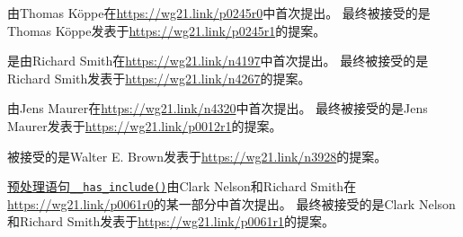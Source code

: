 由Thomas Köppe在\url{https://wg21.link/p0245r0}中首次提出。
最终被接受的是Thomas Köppe发表于\url{https://wg21.link/p0245r1}的提案。

是由Richard Smith在\url{https://wg21.link/n4197}中首次提出。
最终被接受的是Richard Smith发表于\url{https://wg21.link/n4267}的提案。

由Jens Maurer在\url{https://wg21.link/n4320}中首次提出。
最终被接受的是Jens Maurer发表于\url{https://wg21.link/p0012r1}的提案。

被接受的是Walter E. Brown发表于\url{https://wg21.link/n3928}的提案。

\hyperref[ch8.9]{预处理语句\texttt{\_\_has\_include()}}由Clark Nelson和Richard Smith在
\url{https://wg21.link/p0061r0}的某一部分中首次提出。
最终被接受的是Clark Nelson和Richard Smith发表于\url{https://wg21.link/p0061r1}的提案。
